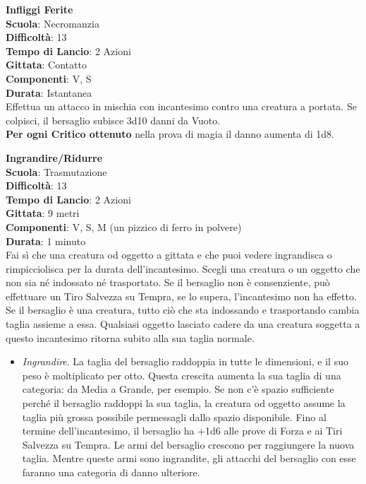 \begin{multicols}{2}
\medskip\textbf{Infliggi Ferite}\\
\textbf{Scuola}: Necromanzia\\
\textbf{Difficoltà}: 13 \\
\textbf{Tempo di Lancio}: 2 Azioni\\
\textbf{Gittata}: Contatto\\
\textbf{Componenti}: V, S\\
\textbf{Durata}: Istantanea\\
Effettua un attacco in mischia con incantesimo contro una creatura a portata. Se colpisci, il bersaglio subisce 3d10 danni da Vuoto.\\
\textbf{Per ogni Critico ottenuto} nella prova di magia il danno aumenta di 1d8.

\medskip\textbf{Ingrandire/Ridurre}\\
\textbf{Scuola}: Trasmutazione\\
\textbf{Difficoltà}: 13\\
\textbf{Tempo di Lancio}: 2 Azioni\\
\textbf{Gittata}: 9 metri\\
\textbf{Componenti}: V, S, M (un pizzico di ferro in polvere)\\
\textbf{Durata}: 1 minuto\\
Fai sì che una creatura od oggetto a gittata e che puoi vedere ingrandisca o rimpicciolisca per la durata dell'incantesimo. Scegli una creatura o un oggetto che non sia né indossato né trasportato. Se il bersaglio non è consenziente, può effettuare un Tiro Salvezza su Tempra, se lo supera, l'incantesimo non ha effetto. Se il bersaglio è una creatura, tutto ciò che sta indossando e trasportando cambia taglia assieme a essa. Qualsiasi oggetto lasciato cadere da una creatura soggetta a questo incantesimo ritorna subito alla sua taglia normale.\\
\medskip
\begin{itemize}
\item
\textit{Ingrandire}. La taglia del bersaglio raddoppia in tutte le dimensioni, e il suo peso è moltiplicato per otto. Questa crescita aumenta la sua taglia di una categoria: da Media a Grande, per esempio. Se non c'è spazio sufficiente perché il bersaglio raddoppi la sua taglia, la creatura od oggetto assume la taglia più grossa possibile permessagli dallo spazio disponibile. Fino al termine dell'incantesimo, il bersaglio ha +1d6 alle prove di Forza e ai Tiri Salvezza su Tempra. Le armi del bersaglio crescono per raggiungere la nuova taglia. Mentre queste armi sono ingrandite, gli attacchi del bersaglio con esse faranno una categoria di danno ulteriore. 

\end{itemize}
\end{multicols}
